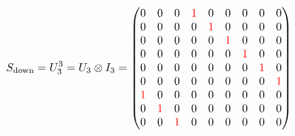 \begin{align}
  S_{\text{down}} = U_3^3 = U_3 \otimes I_3 =
  \begin{pmatrix}
    0                  & 0                  & 0                  & \textcolor{red}{1} & 0                  & 0                  & 0                  & 0                  & 0                  \\
    0                  & 0                  & 0                  & 0                  & \textcolor{red}{1} & 0                  & 0                  & 0                  & 0                  \\
    0                  & 0                  & 0                  & 0                  & 0                  & \textcolor{red}{1} & 0                  & 0                  & 0                  \\
    0                  & 0                  & 0                  & 0                  & 0                  & 0                  & \textcolor{red}{1} & 0                  & 0                  \\
    0                  & 0                  & 0                  & 0                  & 0                  & 0                  & 0                  & \textcolor{red}{1} & 0                  \\
    0                  & 0                  & 0                  & 0                  & 0                  & 0                  & 0                  & 0                  & \textcolor{red}{1} \\
    \textcolor{red}{1} & 0                  & 0                  & 0                  & 0                  & 0                  & 0                  & 0                  & 0                  \\
    0                  & \textcolor{red}{1} & 0                  & 0                  & 0                  & 0                  & 0                  & 0                  & 0                  \\
    0                  & 0                  & \textcolor{red}{1} & 0                  & 0                  & 0                  & 0                  & 0                  & 0
  \end{pmatrix}
\end{align}


